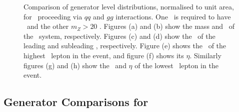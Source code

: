 \begin{figure}
{    }
        \vspace{-2mm}
        \vspace{-2mm}
    \caption{\small Comparison of generator level distributions, normalised to
    unit area, for \ZZsllll\ proceeding via $qq$ and $gg$ interactions. One \Z\ is required to have \sstooos\ and the other
    $m_{Z}>20$ \gev. Figures (a)
    and (b) show the mass and \pt\ of the \ZZ\ system,
    respectively. Figures (c) and (d) show the \pt\ of the
    leading and subleading \Z, respectively. Figure (e) shows the \pt\ of the highest \pt\ lepton in the event, and figure (f) shows its
   $\eta$. Similarly figures (g) and (h) show the \pt\ and $\eta$ of the lowest
   \pt\ lepton in the event.}
    \label{fig:gen-comp-gg-qq-ZZs}
\end{figure}


\subsection{Generator Comparisons for \ZZllll}

